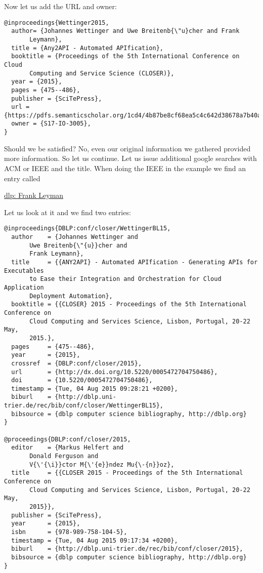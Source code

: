 Now let us add the URL and owner:

\begin{verbatim}
@inproceedings{Wettinger2015, 
  author= {Johannes Wettinger and Uwe Breitenb{\"u}cher and Frank
       Leymann},
  title = {Any2API - Automated APIfication},
  booktitle = {Proceedings of the 5th International Conference on Cloud
       Computing and Service Science (CLOSER)},
  year = {2015},
  pages = {475--486},
  publisher = {SciTePress},
  url ={https://pdfs.semanticscholar.org/1cd4/4b87be8cf68ea5c4c642d38678a7b40a86de.pdf},
  owner = {S17-IO-3005},
} 
\end{verbatim}

Should we be satisfied? No, even our original information we gathered
provided more information. So let us continue. Let us issue additional
google searches with ACM or IEEE and the title. When doing the IEEE in the
example we find an entry called

\href{http://dblp.uni-trier.de\%2Fpers\%2Fl\%2FLeymann\%3AFrank\&usg=AFQjCNHCu-66qxWH0zRlPLr4DA8jIo5V-g\&sig2=1vYdnGOEiMcLBEMpbeBA7g}{dlp:
Frank Leyman}

Let us look at it and we find two entries:

\begin{verbatim}
@inproceedings{DBLP:conf/closer/WettingerBL15,
  author    = {Johannes Wettinger and
       Uwe Breitenb{\"{u}}cher and
       Frank Leymann},
  title     = {{ANY2API} - Automated APIfication - Generating APIs for Executables
       to Ease their Integration and Orchestration for Cloud Application
       Deployment Automation},
  booktitle = {{CLOSER} 2015 - Proceedings of the 5th International Conference on
       Cloud Computing and Services Science, Lisbon, Portugal, 20-22 May,
       2015.},
  pages     = {475--486},
  year      = {2015},
  crossref  = {DBLP:conf/closer/2015},
  url       = {http://dx.doi.org/10.5220/0005472704750486},
  doi       = {10.5220/0005472704750486},
  timestamp = {Tue, 04 Aug 2015 09:28:21 +0200},
  biburl    = {http://dblp.uni-trier.de/rec/bib/conf/closer/WettingerBL15},
  bibsource = {dblp computer science bibliography, http://dblp.org}
}

@proceedings{DBLP:conf/closer/2015,
  editor    = {Markus Helfert and
       Donald Ferguson and
       V{\'{\i}}ctor M{\'{e}}ndez Mu{\-{n}}oz},
  title     = {{CLOSER 2015 - Proceedings of the 5th International Conference on
       Cloud Computing and Services Science, Lisbon, Portugal, 20-22 May,
       2015}},
  publisher = {SciTePress},
  year      = {2015},
  isbn      = {978-989-758-104-5},
  timestamp = {Tue, 04 Aug 2015 09:17:34 +0200},
  biburl    = {http://dblp.uni-trier.de/rec/bib/conf/closer/2015},
  bibsource = {dblp computer science bibliography, http://dblp.org}
}
\end{verbatim}

